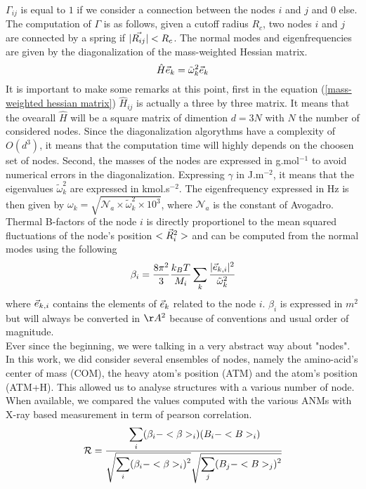 $\Gamma_{ij}$ is equal to $1$ if we consider a connection between the nodes $i$ and $j$ and $0$ else. The computation of $\Gamma$ is as follows, given a cutoff radius $R_c$, two nodes $i$ and $j$ are connected by a spring if $\vert \vec{R_{ij}}\vert < R_c$. The normal modes and eigenfrequencies are given by the diagonalization of the mass-weighted Hessian matrix.
\begin{equation}
	\label{eigen equation}
	\hat{H}\vec{e}_k = \tilde{\omega}_k^2\vec{e}_k
\end{equation}
It is important to make some remarks at this point, first in the equation (\ref{mass-weighted hessian matrix}) $\hat{H}_{ij}$ is actually a three by three matrix. It means that the ovearall $\hat{H}$ will be a square matrix of dimention $d = 3N$ with $N$ the number of considered nodes. Since the diagonalization algorythms have a complexity of $O(d^3)$, it means that the computation time will highly depends on the choosen set of nodes. Second, the masses of the nodes are expressed in g.mol$^{-1}$ to avoid numerical errors in the diagonalization. Expressing $\gamma$ in J.m$^{-2}$, it means that the eigenvalues $\tilde{\omega}_k^2$ are expressed in kmol.s$^{-2}$. The eigenfrequency expressed in Hz is then given by $\omega_k = \sqrt{\mathcal{N}_a \times \tilde{\omega}_k^2 \times 10^3}$, where $\mathcal{N}_a$ is the constant of Avogadro. Thermal B-factors of the node $i$ is directly proportionel to the mean squared fluctuations of the node's position $<\vec{R}_i^2>$ and can be computed from the normal modes using the following 
\begin{equation}
	\label{thermal B-factors}
	\beta_i = \frac{8\pi^2}{3}\frac{k_BT}{M_i}\sum_k\cfrac{\vert\vec{e}_{k, i}\vert^2}{\tilde{\omega}_k^2}
\end{equation}
where $\vec{e}_{k, i}$ contains the elements of $\vec{e}_k$ related to the node $i$. $\beta_i$ is expressed in $m^2$ but will always be converted in $\AA^2$ because of conventions and usual order of magnitude.\\
\noindent Ever since the beginning, we were talking in a very abstract way about "nodes". In this work, we did consider several ensembles of nodes, namely the amino-acid's center of mass (COM), the heavy atom's position (ATM) and the atom's position (ATM+H). This allowed us to analyse structures with a various number of node. When available, we compared the values computed with the various ANMs with X-ray based measurement in term of pearson correlation.
\begin{equation}
	\label{pearsonr}
	\mathcal{R} = \cfrac{\displaystyle\sum_i (\beta_i - <\beta>_i)(B_i - <B>_i)}{\sqrt{\displaystyle\sum_i(\beta_i - <\beta>_i)^2}\sqrt{\displaystyle\sum_j(B_j - <B>_j)^2}}
\end{equation}
